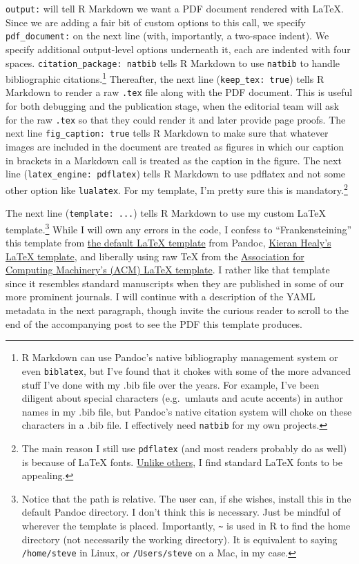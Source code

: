 \documentclass[11pt,]{article}
\begin{document}
\texttt{output:} will tell R Markdown we want a PDF document rendered
with LaTeX. Since we are adding a fair bit of custom options to this
call, we specify \texttt{pdf\_document:} on the next line (with,
importantly, a two-space indent). We specify additional output-level
options underneath it, each are indented with four spaces.
\texttt{citation\_package:\ natbib} tells R Markdown to use
\texttt{natbib} to handle bibliographic citations.\footnote{R Markdown
  can use Pandoc's native bibliography management system or even
  \texttt{biblatex}, but I've found that it chokes with some of the more
  advanced stuff I've done with my .bib file over the years. For
  example, I've been diligent about special characters (e.g.~umlauts and
  acute accents) in author names in my .bib file, but Pandoc's native
  citation system will choke on these characters in a .bib file. I
  effectively need \texttt{natbib} for my own projects.} Thereafter, the
next line (\texttt{keep\_tex:\ true}) tells R Markdown to render a raw
\texttt{.tex} file along with the PDF document. This is useful for both
debugging and the publication stage, when the editorial team will ask
for the raw \texttt{.tex} so that they could render it and later provide
page proofs. The next line \texttt{fig\_caption:\ true} tells R Markdown
to make sure that whatever images are included in the document are
treated as figures in which our caption in brackets in a Markdown call
is treated as the caption in the figure. The next line
(\texttt{latex\_engine:\ pdflatex}) tells R Markdown to use pdflatex and
not some other option like \texttt{lualatex}. For my template, I'm
pretty sure this is mandatory.\footnote{The main reason I still use
  \texttt{pdflatex} (and most readers probably do as well) is because of
  LaTeX fonts.
  \href{http://www-rohan.sdsu.edu/~aty/bibliog/latex/gripe.html}{Unlike
  others}, I find standard LaTeX fonts to be appealing.}

The next line (\texttt{template:\ ...}) tells R Markdown to use my
custom LaTeX template.\footnote{Notice that the path is relative. The
  user can, if she wishes, install this in the default Pandoc directory.
  I don't think this is necessary. Just be mindful of wherever the
  template is placed. Importantly, \texttt{\textasciitilde{}} is used in
  R to find the home directory (not necessarily the working directory).
  It is equivalent to saying \texttt{/home/steve} in Linux, or
  \texttt{/Users/steve} on a Mac, in my case.} While I will own any
errors in the code, I confess to ``Frankensteining'' this template from
\href{https://github.com/jgm/pandoc-templates}{the default LaTeX
template} from Pandoc,
\href{https://github.com/kjhealy/pandoc-templates/tree/master/templates}{Kieran
Healy's LaTeX template}, and liberally using raw TeX from the
\href{https://www.acm.org/publications/article-templates/acm-latex-style-guide}{Association
for Computing Machinery's (ACM) LaTeX template}. I rather like that
template since it resembles standard manuscripts when they are published
in some of our more prominent journals. I will continue with a
description of the YAML metadata in the next paragraph, though invite
the curious reader to scroll to the end of the accompanying post to see
the PDF this template produces.
\end{document}
